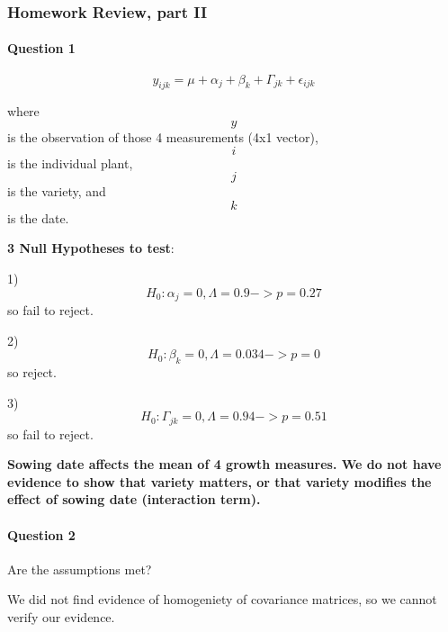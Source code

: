 \hypertarget{homework-review-part-ii}{%
\subsubsection{Homework Review, part II}\label{homework-review-part-ii}}

\hypertarget{question-1}{%
\paragraph{Question 1}\label{question-1}}

\[y_{ijk} = \mu + \alpha_j + \beta_k + \Gamma_{jk} + \epsilon_{ijk}\]

where \[y\] is the observation of those 4 measurements (4x1 vector),
\[i\] is the individual plant, \[j\] is the variety, and \[k\] is the
date.

\textbf{3 Null Hypotheses to test}:

1) \[H_0: \alpha_j = 0, \Lambda = 0.9 -> p = 0.27\] so fail to reject.

2) \[H_0: \beta_k = 0, \Lambda = 0.034 -> p = 0\] so reject.

3) \[H_0: \Gamma_{jk} = 0, \Lambda = 0.94 -> p = 0.51\] so fail to
reject.

\textbf{Sowing date affects the mean of 4 growth measures. We do not
have evidence to show that variety matters, or that variety modifies the
effect of sowing date (interaction term).}

\hypertarget{question-2}{%
\paragraph{Question 2}\label{question-2}}

Are the assumptions met?

We did not find evidence of homogeniety of covariance matrices, so we
cannot verify our evidence.
